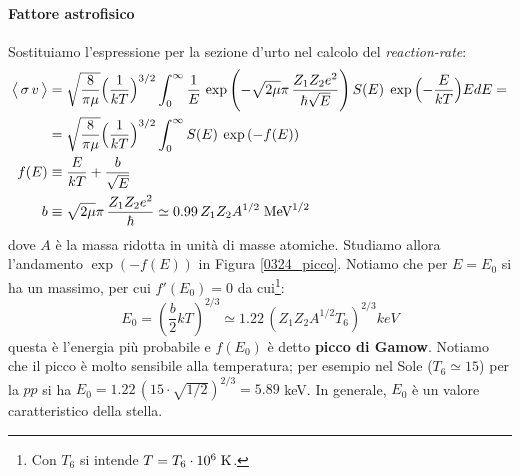 \paragraph{Fattore astrofisico} 
Sostituiamo l'espressione per la sezione d'urto nel calcolo del \textit{reaction-rate}:
\begin{align*}
\bigl\langle\, \sigma\, v \, \bigr\rangle &= \sqrt{\frac{8}{\pi\mu}} \Bigl ( \frac{1}{kT} \Bigr )^{3/2} \int_0^\infty \frac{1}{E}\,\exp{\Biggl ( -\sqrt{2\mu}\pi\, \frac{Z_1Z_2 e^2}{\hbar \sqrt{E}} \Biggr )}\, S(E) \; \exp{\Bigl ( -\frac{E}{kT} \Bigr )} E dE = \\
&= \sqrt{\frac{8}{\pi\mu}} \Bigl ( \frac{1}{kT} \Bigr )^{3/2} \int_0^\infty S(E) \: \exp{(-f(E))} \\
f(E) &\equiv \frac{E}{kT} + \frac{b}{\sqrt{E}}\\
b &\equiv \sqrt{2\mu}\pi\, \frac{Z_1Z_2 e^2}{\hbar} \simeq 0.99 \, Z_1 Z_2 A^{1/2} \;\mbox{MeV}^{1/2}
\end{align*}
\noindent dove $A$ è la massa ridotta in unità di masse atomiche. Studiamo allora l'andamento $\exp{(-f(E))}$ in Figura \ref{0324_picco}. Notiamo che per $E=E_0$ si ha un massimo, per cui $f'(E_0) = 0$ da cui\footnote{Con $T_6$ si intende $T = T_6 \cdot 10^{6}\;\mbox{K}$.}: 
$$E_0 = (\frac{b}{2}kT)^{2/3} \simeq 1.22 \, (Z_1Z_2 A^{1/2} T_6)^{2/3}\unit{keV} $$
questa è l'energia più probabile e $f(E_0)$ è detto \textbf{picco di Gamow}. Notiamo che il picco è molto sensibile alla temperatura; per esempio nel Sole ($T_6\simeq 15$) per la $pp$ si ha $E_0 = 1.22\, (15\cdot \sqrt{1/2})^{2/3} = 5.89$ keV. In generale, $E_0$ è un valore caratteristico della stella.
